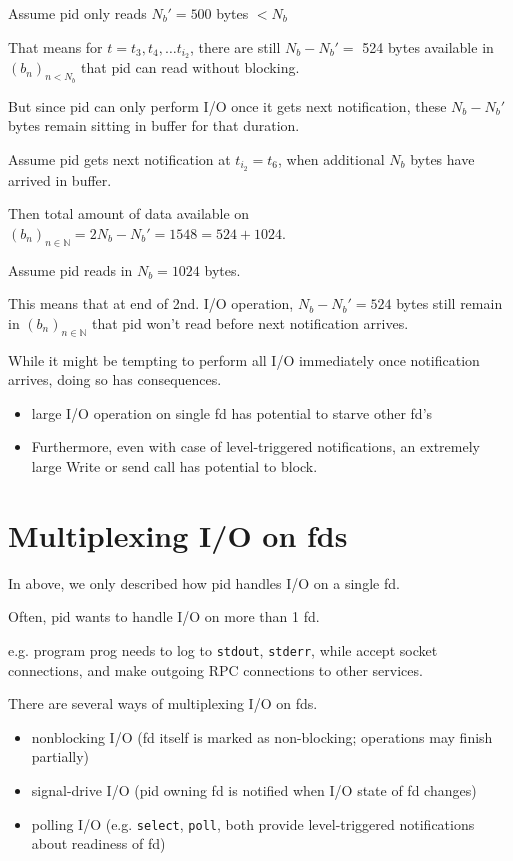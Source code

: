 \documentclass[10pt]{amsart}
\begin{document}
\begin{multicols*}{2}
Assume pid only reads $N_b' = 500$ bytes $<N_b$

That means for $t=t_3, t_4, \dots t_{i_2}$, there are still $N_b - N_b' = $ 524 bytes available in $(b_n)_{n < N_b}$ that pid can read without blocking.

But since pid can only perform I/O once it gets next notification, these $N_b - N_b'$ bytes remain sitting in buffer for that duration.

Assume pid gets next notification at $t_{i_2} = t_6$, when additional $N_b$ bytes have arrived in buffer.

Then total amount of data available on $(b_n)_{n\in \mathbb{N}} = 2N_b - N_b' = 1548 = 524 + 1024$.

Assume pid reads in $N_b = 1024$ bytes.

This means that at end of 2nd. I/O operation, $N_b - N_b' = 524$ bytes still remain in $(b_n)_{n\in \mathbb{N}}$ that pid won't read before next notification arrives.

While it might be tempting to perform all I/O immediately once notification arrives, doing so has consequences. 
\begin{itemize}
	\item large I/O operation on single fd has potential to starve other fd's 
	\item Furthermore, even with case of level-triggered notifications, an extremely large Write or send call has potential to block.
\end{itemize}

\section{Multiplexing I/O on fds}

In above, we only described how pid handles I/O on a single fd.

Often, pid wants to handle I/O on more than 1 fd.

e.g. program prog needs to log to \texttt{stdout}, \texttt{stderr}, while accept socket connections, and make outgoing RPC connections to other services. 


There are several ways of multiplexing I/O on fds.
\begin{itemize}
	\item nonblocking I/O (fd itself is marked as non-blocking; operations may finish partially)
	\item signal-drive I/O (pid owning fd is notified when I/O state of fd changes)
	\item polling I/O (e.g. \texttt{select}, \texttt{poll}, both provide level-triggered notifications about readiness of fd)
\end{itemize}


\end{multicols*}
\end{document}
